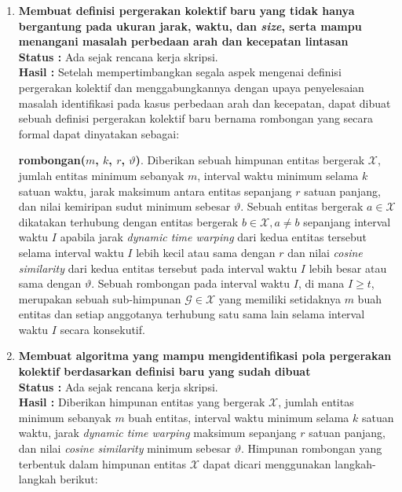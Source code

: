 \documentclass[a4paper,twoside]{article}
\begin{document}
\begin{enumerate}
		\item \textbf{Membuat definisi pergerakan kolektif baru yang tidak hanya bergantung pada ukuran jarak, waktu, dan \textit{size}, serta mampu menangani masalah perbedaan arah dan kecepatan lintasan}\\
		{\bf Status :} Ada sejak rencana kerja skripsi.\\
		{\bf Hasil :} Setelah mempertimbangkan segala aspek mengenai definisi pergerakan kolektif dan menggabungkannya dengan upaya penyelesaian masalah identifikasi pada kasus perbedaan arah dan kecepatan, dapat dibuat sebuah definisi pergerakan kolektif baru bernama rombongan yang secara formal dapat dinyatakan sebagai:
		
		\noindent \textbf{rombongan($m$, $k$, $r$, $\vartheta$)}. Diberikan sebuah himpunan entitas bergerak $\mathcal{X}$, jumlah entitas minimum sebanyak $m$, interval waktu minimum selama $k$ satuan waktu, jarak maksimum antara entitas sepanjang $r$ satuan panjang, dan nilai kemiripan sudut minimum sebesar $\vartheta$. Sebuah entitas bergerak $a \in \mathcal{X}$ dikatakan terhubung dengan entitas bergerak $b \in \mathcal{X}, a \neq b$ sepanjang interval waktu $I$ apabila jarak \textit{dynamic time warping} dari kedua entitas tersebut selama interval waktu $I$ lebih kecil atau sama dengan $r$ dan nilai \textit{cosine similarity} dari kedua entitas tersebut pada interval waktu $I$ lebih besar atau sama dengan $\vartheta$. Sebuah rombongan pada interval waktu $I$, di mana $I \geq t$, merupakan sebuah sub-himpunan $\mathcal{G} \in \mathcal{X}$ yang memiliki setidaknya $m$ buah entitas dan setiap anggotanya terhubung satu sama lain selama interval waktu $I$ secara konsekutif. \\

		\item \textbf{Membuat algoritma yang mampu mengidentifikasi pola pergerakan kolektif berdasarkan definisi baru yang sudah dibuat}\\
		{\bf Status :} Ada sejak rencana kerja skripsi.\\
		{\bf Hasil :} Diberikan himpunan entitas yang bergerak $\mathcal{X}$, jumlah entitas minimum sebanyak $m$ buah entitas, interval waktu minimum selama $k$ satuan waktu, jarak \textit{dynamic time warping} maksimum sepanjang $r$ satuan panjang, dan nilai \textit{cosine similarity} minimum sebesar $\vartheta$. Himpunan rombongan yang terbentuk dalam himpunan entitas $\mathcal{X}$ dapat dicari menggunakan langkah-langkah berikut:
		

\end{enumerate}
\end{document}
